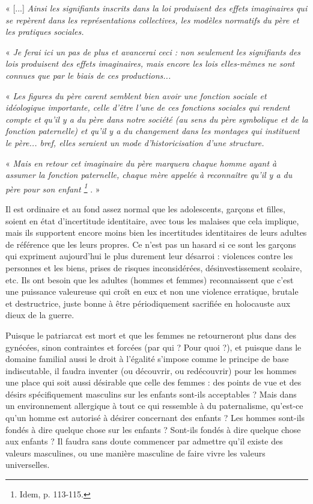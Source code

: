  « [...] \emph{Ainsi les signifiants inscrits dans la loi produisent des effets imaginaires qui se repèrent dans les représentations collectives, les modèles normatifs du père et les pratiques sociales.} 

 « \emph{Je ferai ici un pas de plus et avancerai ceci : non seulement les signifiants des lois produisent des effets imaginaires, mais encore les lois elles-mêmes ne sont connues que par le biais de ces productions...}

 « \emph{Les figures du père carent semblent bien avoir une fonction sociale et idéologique importante, celle d'être l'une de ces fonctions sociales qui rendent compte et qu'il y a du père dans notre société (au sens du père symbolique et de la fonction paternelle) et qu'il y a du changement dans les montages qui instituent le père... bref, elles seraient un mode d'historicisation d'une structure.}

 « \emph{Mais en retour cet imaginaire du père marquera chaque homme ayant à assumer la fonction paternelle, chaque mère appelée à reconnaître qu'il y a du père pour son enfant%
\footnote{Idem, p. 113-115.}%
}. » 

 Il est ordinaire et au fond assez normal que les adolescents, garçons et filles, soient en état d'incertitude identitaire, avec tous les malaises que cela implique, mais ils supportent encore moins bien les incertitudes identitaires de leurs adultes de référence que les leurs propres. Ce n'est pas un hasard si ce sont les garçons qui expriment aujourd'hui le plus durement leur désarroi : violences contre les personnes et les biens, prises de risques inconsidérées, désinvestissement scolaire, etc. Ils ont besoin que les adultes (hommes et femmes) reconnaissent que c'est une puissance valeureuse qui croît en eux et non une violence erratique, brutale et destructrice, juste bonne à être périodiquement sacrifiée en holocauste aux dieux de la guerre.

 Puisque le patriarcat est mort et que les femmes ne retourneront plus dans des gynécées, sinon contraintes et forcées (par qui ? Pour quoi ?), et puisque dans le domaine familial aussi le droit à l'égalité s'impose comme le principe de base indiscutable, il faudra inventer (ou découvrir, ou redécouvrir) pour les hommes une place qui soit aussi désirable que celle des femmes : des points de vue et des désirs spécifiquement masculins sur les enfants sont-ils acceptables ? Mais dans un environnement allergique à tout ce qui ressemble à du paternalisme, qu'est-ce qu'un homme est autorisé à désirer concernant des enfants ? Les hommes sont-ils fondés à dire quelque chose sur les enfants ? Sont-ils fondés à dire quelque chose aux enfants ? Il faudra sans doute commencer par admettre qu'il existe des valeurs masculines, ou une manière masculine de faire vivre les valeurs universelles.

